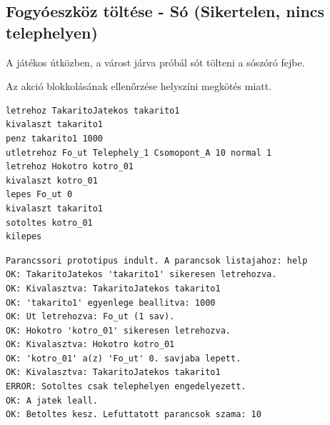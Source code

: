 \subsection{Fogyóeszköz töltése - Só (Sikertelen, nincs telephelyen)}
\begin{test-case-description}
    A játékos útközben, a várost járva próbál sót tölteni a sószóró fejbe.
\end{test-case-description}
\begin{test-case-function}
    Az akció blokkolásának ellenőrzése helyszíni megkötés miatt.
\end{test-case-function}
\begin{test-case-input}
\begin{verbatim}
letrehoz TakaritoJatekos takarito1
kivalaszt takarito1
penz takarito1 1000
utletrehoz Fo_ut Telephely_1 Csomopont_A 10 normal 1
letrehoz Hokotro kotro_01
kivalaszt kotro_01
lepes Fo_ut 0
kivalaszt takarito1
sotoltes kotro_01
kilepes
\end{verbatim}
\end{test-case-input}
\begin{test-case-output}
\begin{verbatim}
Parancssori prototipus indult. A parancsok listajahoz: help
OK: TakaritoJatekos 'takarito1' sikeresen letrehozva.
OK: Kivalasztva: TakaritoJatekos takarito1
OK: 'takarito1' egyenlege beallitva: 1000
OK: Ut letrehozva: Fo_ut (1 sav).
OK: Hokotro 'kotro_01' sikeresen letrehozva.
OK: Kivalasztva: Hokotro kotro_01
OK: 'kotro_01' a(z) 'Fo_ut' 0. savjaba lepett.
OK: Kivalasztva: TakaritoJatekos takarito1
ERROR: Sotoltes csak telephelyen engedelyezett.
OK: A jatek leall.
OK: Betoltes kesz. Lefuttatott parancsok szama: 10
\end{verbatim}
\end{test-case-output}

